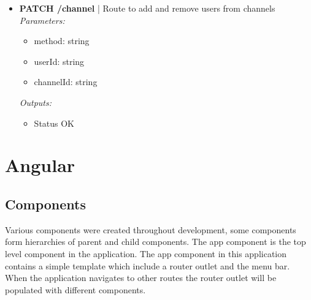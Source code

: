 \documentclass[11pt, conference,letterpaper]{IEEEtran}
\begin{document}
\begin{itemize}
    \item \textbf{PATCH /channel} | Route to add and remove users from channels
        \\ \textit{Parameters: }
        \begin{itemize}
            \item method: string
            \item userId: string
            \item channelId: string
        \end{itemize}
        \textit{Outputs: }
        \begin{itemize}
            \item Status OK
        \end{itemize}
\end{itemize}

\section{Angular}
\subsection{Components}
\par Various components were created throughout development, some components form hierarchies of parent and child components. The app component is the top level component in the application. The app component in this application contains a simple template which include a router outlet and the menu bar. When the application navigates to other routes the router outlet will be populated with different components.
\end{document}
